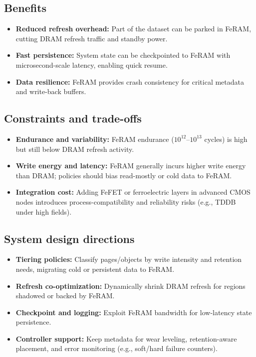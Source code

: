 \subsection*{Benefits}
\begin{itemize}
  \item \textbf{Reduced refresh overhead:} Part of the dataset can be parked in FeRAM, cutting DRAM refresh traffic and standby power.
  \item \textbf{Fast persistence:} System state can be checkpointed to FeRAM with microsecond-scale latency, enabling quick resume.
  \item \textbf{Data resilience:} FeRAM provides crash consistency for critical metadata and write-back buffers.
\end{itemize}

\subsection*{Constraints and trade-offs}
\begin{itemize}
  \item \textbf{Endurance and variability:} FeRAM endurance ($10^{12}$--$10^{13}$ cycles) is high but still below DRAM refresh activity.
  \item \textbf{Write energy and latency:} FeRAM generally incurs higher write energy than DRAM; policies should bias read-mostly or cold data to FeRAM.
  \item \textbf{Integration cost:} Adding FeFET or ferroelectric layers in advanced CMOS nodes introduces process-compatibility and reliability risks (e.g., TDDB under high fields).
\end{itemize}

\subsection*{System design directions}
\begin{itemize}
  \item \textbf{Tiering policies:} Classify pages/objects by write intensity and retention needs, migrating cold or persistent data to FeRAM.
  \item \textbf{Refresh co-optimization:} Dynamically shrink DRAM refresh for regions shadowed or backed by FeRAM.
  \item \textbf{Checkpoint and logging:} Exploit FeRAM bandwidth for low-latency state persistence.
  \item \textbf{Controller support:} Keep metadata for wear leveling, retention-aware placement, and error monitoring (e.g., soft/hard failure counters).
\end{itemize}
